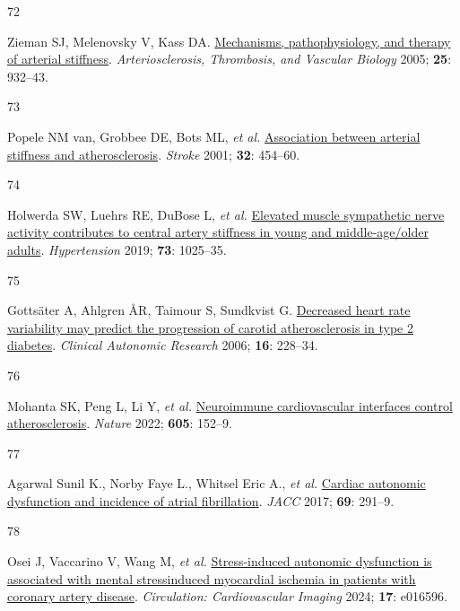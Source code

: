 \documentclass[
  a4paper,
  headsepline=true,
  open=any]{scrbook}
\newlength{\cslhangindent}
\newlength{\csllabelwidth}
\newlength{\cslentryspacingunit} %
\newenvironment{CSLReferences}[2] %
 {%
  \setlength{\parindent}{0pt}
  \ifodd #1
  \let\oldpar\par
  \def\par{\hangindent=\cslhangindent\oldpar}
  \fi
  \setlength{\parskip}{#2\cslentryspacingunit}
 }%
 {}
\newcommand{\CSLLeftMargin}[1]{\parbox[t]{\csllabelwidth}{#1}}
\newcommand{\CSLRightInline}[1]{\parbox[t]{\linewidth - \csllabelwidth}{#1}\break}
\begin{document}
\begin{CSLReferences}{0}{0}
\leavevmode{}%
\CSLLeftMargin{72 }%
\CSLRightInline{Zieman SJ, Melenovsky V, Kass DA.
\href{https://doi.org/10.1161/01.ATV.0000160548.78317.29}{Mechanisms,
pathophysiology, and therapy of arterial stiffness}.
\emph{Arteriosclerosis, Thrombosis, and Vascular Biology} 2005;
\textbf{25}: 932--43.}

\leavevmode{}%
\CSLLeftMargin{73 }%
\CSLRightInline{Popele NM van, Grobbee DE, Bots ML, \emph{et al.}
\href{https://doi.org/10.1161/01.STR.32.2.454}{Association between
arterial stiffness and atherosclerosis}. \emph{Stroke} 2001;
\textbf{32}: 454--60.}

\leavevmode{}%
\CSLLeftMargin{74 }%
\CSLRightInline{Holwerda SW, Luehrs RE, DuBose L, \emph{et al.}
\href{https://doi.org/doi:10.1161/HYPERTENSIONAHA.118.12462}{Elevated
muscle sympathetic nerve activity contributes to central artery
stiffness in young and middle-age/older adults}. \emph{Hypertension}
2019; \textbf{73}: 1025--35.}

\leavevmode{}%
\CSLLeftMargin{75 }%
\CSLRightInline{Gottsäter A, Ahlgren ÅR, Taimour S, Sundkvist G.
\href{https://doi.org/10.1007/s10286-006-0345-4}{Decreased heart rate
variability may predict the progression of carotid atherosclerosis in
type 2 diabetes}. \emph{Clinical Autonomic Research} 2006; \textbf{16}:
228--34.}

\leavevmode{}%
\CSLLeftMargin{76 }%
\CSLRightInline{Mohanta SK, Peng L, Li Y, \emph{et al.}
\href{https://doi.org/10.1038/s41586-022-04673-6}{Neuroimmune
cardiovascular interfaces control atherosclerosis}. \emph{Nature} 2022;
\textbf{605}: 152--9.}

\leavevmode{}%
\CSLLeftMargin{77 }%
\CSLRightInline{Agarwal Sunil K., Norby Faye L., Whitsel Eric A.,
\emph{et al.} \href{https://doi.org/10.1016/j.jacc.2016.10.059}{Cardiac
autonomic dysfunction and incidence of atrial fibrillation}. \emph{JACC}
2017; \textbf{69}: 291--9.}

\leavevmode{}%
\CSLLeftMargin{78 }%
\CSLRightInline{Osei J, Vaccarino V, Wang M, \emph{et al.}
\href{https://doi.org/10.1161/CIRCIMAGING.124.016596}{Stress-induced
autonomic dysfunction is associated with mental
stress{\textendash}induced myocardial ischemia in patients with coronary
artery disease}. \emph{Circulation: Cardiovascular Imaging} 2024;
\textbf{17}: e016596.}


\end{CSLReferences}
\end{document}
